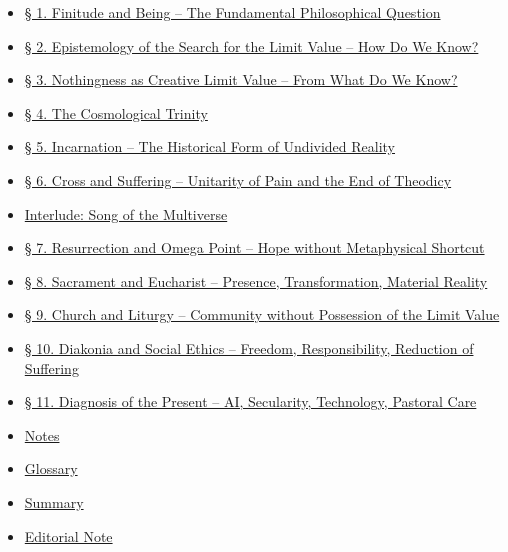\documentclass[
  english,
]{article}
\providecommand{\tightlist}{%
  \setlength{\itemsep}{0pt}\setlength{\parskip}{0pt}}
\begin{document}
\begin{itemize}
\tightlist
\item
  \hyperref[-1-finitude-and-being-the-fundamental-philosophical-question]{§
  1. Finitude and Being -- The Fundamental Philosophical Question}
\item
  \hyperref[-2-epistemology-of-the-search-for-the-limit-value-how-do-we-know]{§
  2. Epistemology of the Search for the Limit Value -- How Do We Know?}
\item
  \hyperref[-3-nothingness-as-creative-limit-value-from-what-do-we-know]{§
  3. Nothingness as Creative Limit Value -- From What Do We Know?}
\item
  \hyperref[-4-the-cosmological-trinity]{§ 4. The Cosmological Trinity}
\item
  \hyperref[-5-incarnation-the-historical-form-of-undivided-reality]{§
  5. Incarnation -- The Historical Form of Undivided Reality}
\item
  \hyperref[-6-cross-and-suffering-unitarity-of-pain-and-the-end-of-theodicy]{§
  6. Cross and Suffering -- Unitarity of Pain and the End of Theodicy}
\item
  \hyperref[interlude-song-of-the-multiverse]{Interlude: Song of the
  Multiverse}
\item
  \hyperref[-7-resurrection-and-omega-point-hope-without-metaphysical-shortcut]{§
  7. Resurrection and Omega Point -- Hope without Metaphysical Shortcut}
\item
  \hyperref[-8-sacrament-and-eucharist-presence-transformation-material-reality]{§
  8. Sacrament and Eucharist -- Presence, Transformation, Material
  Reality}
\item
  \hyperref[-9-church-and-liturgy-community-without-possession-of-the-limit-value]{§
  9. Church and Liturgy -- Community without Possession of the Limit
  Value}
\item
  \hyperref[-10-diakonia-and-social-ethics-freedom-responsibility-reduction-of-suffering]{§
  10. Diakonia and Social Ethics -- Freedom, Responsibility, Reduction
  of Suffering}
\item
  \hyperref[-11-diagnosis-of-the-present-ai-secularity-technology-pastoral-care]{§
  11. Diagnosis of the Present -- AI, Secularity, Technology, Pastoral
  Care}
\item
  \hyperref[notes]{Notes}
\item
  \hyperref[glossary]{Glossary}
\item
  \hyperref[summary]{Summary}
\item
  \hyperref[editorial-note]{Editorial Note}
\end{itemize}
\end{document}
